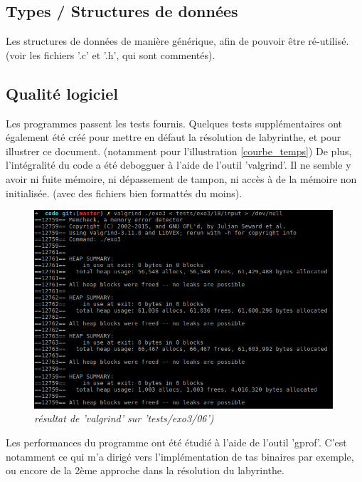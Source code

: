 \documentclass[10pt]{article}
\begin{document}
		\subsection{Types / Structures de données}
		
		Les structures de données de manière générique, afin de pouvoir être ré-utilisé.
		(voir les fichiers '.c' et '.h', qui sont commentés). 

		\subsection{Qualité logiciel}
			Les programmes passent les tests fournis. Quelques tests supplémentaires ont également été créé pour mettre en défaut la résolution de labyrinthe,
			et pour illustrer ce document. (notamment pour l'illustration \ref{courbe_temps})\newline
			De plus, l'intégralité du code a été debogguer à l'aide de l'outil 'valgrind'.
			Il ne semble y avoir ni fuite mémoire, ni dépassement de tampon, ni accès à de la mémoire non initialisée.
			(avec des fichiers bien formattés du moins).
			\begin{figure}[H]
				\begin{center}
					\includegraphics[width=12cm,height=\textheight,keepaspectratio]{./images/valgrind.png}
				\end{center}
				\caption{\textit{résultat de 'valgrind' sur 'tests/exo3/06')}}
			\end{figure}
			Les performances du programme ont été étudié à l'aide de l'outil 'gprof'.
			C'est notamment ce qui m'a dirigé vers l'implémentation de tas binaires par exemple,
			ou encore de la 2ème approche dans la résolution du labyrinthe.

	\newpage
\end{document}

